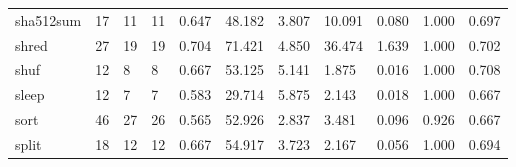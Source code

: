 \begin{longtable}{lp{1.2cm}p{1.2cm}p{1.2cm}p{1.2cm}p{1.2cm}p{1.2cm}p{1.2cm}p{1.2cm}p{1.2cm}p{1.2cm}}
sha512sum &                           17 &                 11 &                                11 &                                      0.647 &                                 48.182 &                                        3.807 &                            10.091 &                                   0.080 &                              1.000 &                                              0.697 \\
shred     &                           27 &                 19 &                                19 &                                      0.704 &                                 71.421 &                                        4.850 &                            36.474 &                                   1.639 &                              1.000 &                                              0.702 \\
shuf      &                           12 &                  8 &                                 8 &                                      0.667 &                                 53.125 &                                        5.141 &                             1.875 &                                   0.016 &                              1.000 &                                              0.708 \\
sleep     &                           12 &                  7 &                                 7 &                                      0.583 &                                 29.714 &                                        5.875 &                             2.143 &                                   0.018 &                              1.000 &                                              0.667 \\
sort      &                           46 &                 27 &                                26 &                                      0.565 &                                 52.926 &                                        2.837 &                             3.481 &                                   0.096 &                              0.926 &                                              0.667 \\
split     &                           18 &                 12 &                                12 &                                      0.667 &                                 54.917 &                                        3.723 &                             2.167 &                                   0.056 &                              1.000 &                                              0.694 \\

\end{longtable}

